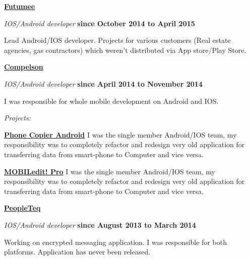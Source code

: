 \documentclass[10pt]{article}
\newenvironment{outerlist}[0]%
        {\begin{itemize}}
        {\end{itemize}
         \vspace{-.6\baselineskip}}
\newenvironment{innerlist}[0]%
        {\begin{compactitem}}
        {\end{compactitem}}
\newcommand{\blankline}{\quad\pagebreak[2]}
\begin{document}
\blankline

\href{http://www.futumee.com/}{\textbf{Futumee}}
\begin{outerlist}
  \item[] \textit{IOS/Android developer}%
          \hfill \textbf{since October 2014 to April 2015}
  \begin{innerlist}
    \item[] Lead Android/IOS developer. Projects for various customers (Real
estate agencies, gas contractors) which weren't distributed via App store/Play
Store.
  \end{innerlist}
\end{outerlist}

\blankline

\href{http://www.mobiledit.com/}{\textbf{Compelson}}
\begin{outerlist}
  \item[] \textit{IOS/Android developer}%
          \hfill \textbf{since April 2014 to November 2014}
  \begin{innerlist}
    \item[] I was responsible for whole mobile development on Android and IOS.
  \end{innerlist}
  \item[] \textit{Projects:}%
  \begin{innerlist}
	 	 \item[]  \href{https://play.google.com/store/apps/details?id=com.compelson.migrator&hl=sk}{\textbf{Phone Copier Android}} \newline
		 I was the single member Android/IOS team, my responsibility was to
completely refactor and redesign very old application for transferring data
from smart-phone to Computer and vice versa.
		\newline
	 	 \item[]  \href{https://itunes.apple.com/us/app/mobiledit!-pro/id547602472?mt=8}{\textbf{MOBILedit! Pro}} \newline
		 I was the single member Android/IOS team, my responsibility was to
completely refactor and redesign very old application for transferring data
from smart-phone to Computer and vice versa.
		 \newline
	 \end{innerlist}
\end{outerlist}

\blankline


\href{http://www.peopleteq.com/}{\textbf{PeopleTeq}}
\begin{outerlist}
  \item[] \textit{IOS/Android developer}%
          \hfill \textbf{since August 2013 to March 2014}
  \begin{innerlist}
    \item[] Working on encrypted messaging application. I was responsible for both
platforms. Application has never been released.
  \end{innerlist}
\end{outerlist}
\end{document}
